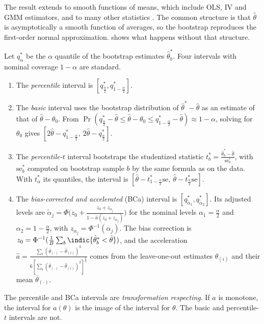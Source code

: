 The result extends to smooth functions of means, which include OLS, IV and GMM estimators, and to many other
statistics \citep{BickelFreedman1981,Hall1992}. The common structure is that $\hat\theta$ is asymptotically a smooth
function of averages, so the bootstrap reproduces the first-order normal approximation. 
shows what happens without that structure.

Let $q^*_\alpha$ be the $\alpha$ quantile of the bootstrap estimates $\hat\theta^*_b$. Four intervals with nominal
coverage $1 - \alpha$ are standard.
\begin{enumerate}[label=(\roman*)]
  \item The \emph{percentile} interval is $[q^*_{\frac{\alpha}{2}}, q^*_{1-\frac{\alpha}{2}}]$.
  \item The \emph{basic} interval uses the bootstrap distribution of $\hat\theta^* - \hat\theta$ as an estimate of
  that of $\hat\theta - \theta_0$. From $\Pr(q^*_{\frac{\alpha}{2}} - \hat\theta \le \hat\theta - \theta_0 \le
  q^*_{1-\frac{\alpha}{2}} - \hat\theta) \approx 1 - \alpha$, solving for $\theta_0$ gives
  $[2\hat\theta - q^*_{1-\frac{\alpha}{2}},\ 2\hat\theta - q^*_{\frac{\alpha}{2}}]$.
  \item The \emph{percentile-$t$} interval bootstraps the studentized statistic $t^*_b = \frac{\hat\theta^*_b -
  \hat\theta}{\mathrm{se}^*_b}$, with $\mathrm{se}^*_b$ computed on bootstrap sample $b$ by the same formula as on the
  data. With $t^*_\alpha$ its quantiles, the interval is $[\hat\theta - t^*_{1-\frac{\alpha}{2}}\mathrm{se},\
  \hat\theta - t^*_{\frac{\alpha}{2}}\mathrm{se}]$.
  \item The \emph{bias-corrected and accelerated} (BCa) interval is $[q^*_{\tilde\alpha_1}, q^*_{\tilde\alpha_2}]$. Its
  adjusted levels are $\tilde\alpha_j = \Phi\bigl(z_0 + \frac{z_0 + z_{\alpha_j}}{1 - \hat a(z_0 + z_{\alpha_j})}\bigr)$
  for the nominal levels $\alpha_1 = \frac{\alpha}{2}$ and $\alpha_2 = 1 - \frac{\alpha}{2}$, with $z_{\alpha_j} =
  \Phi^{-1}(\alpha_j)$. The bias correction is $z_0 = \Phi^{-1}(\frac{1}{B}\sum_b\indic\{\hat\theta^*_b < \hat\theta\})$, and the
  acceleration $\hat a = \frac{\sum_i(\bar\theta_{(\cdot)} - \hat\theta_{(i)})^3}{6[\sum_i(\bar\theta_{(\cdot)} -
  \hat\theta_{(i)})^2]^{\frac{3}{2}}}$ comes from the leave-one-out estimates $\hat\theta_{(i)}$ and their mean
  $\bar\theta_{(\cdot)}$.
\end{enumerate}
The percentile and BCa intervals are \emph{transformation respecting}. If $a$ is monotone, the interval for
$a(\theta)$ is the image of the interval for $\theta$. The basic and percentile-$t$ intervals are not.

